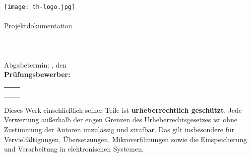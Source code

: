 \begin{titlepage}

\begin{center}
\texttt{[image: th-logo.jpg]}\\[1ex]
\Large{\studiengang}\\[3ex]

\Large{Projektdokumentation}\\
\LARGE{\betreff}\\[4ex]

\huge{\textbf{\titel}}\\[1.5ex]
\Large{\textbf{\untertitel}}\\[4ex]

\normalsize
Abgabetermin: \abgabeOrt, den \abgabeTermin\\[3em]
\textbf{Prüfungsbewerber:}\\
\begin{tabular}{cc}
	\autorEinsName & \autorZweiName\\
	\autorEinsAnschrift & \autorZweiAnschrift\\
	\autorEinsOrt & \autorZweiOrt\\[5ex]
\end{tabular}

\end{center}

\small
\noindent
Dieses Werk einschließlich seiner Teile ist \textbf{urheberrechtlich geschützt}.
Jede Verwertung außerhalb der engen Grenzen des Urheberrechtsgesetzes ist ohne
Zustimmung der Autoren unzulässig und strafbar. Das gilt insbesondere für 
Vervielfältigungen, Übersetzungen, Mikroverfilmungen sowie die Einspeicherung
und Verarbeitung in elektronischen Systemen.

\end{titlepage}